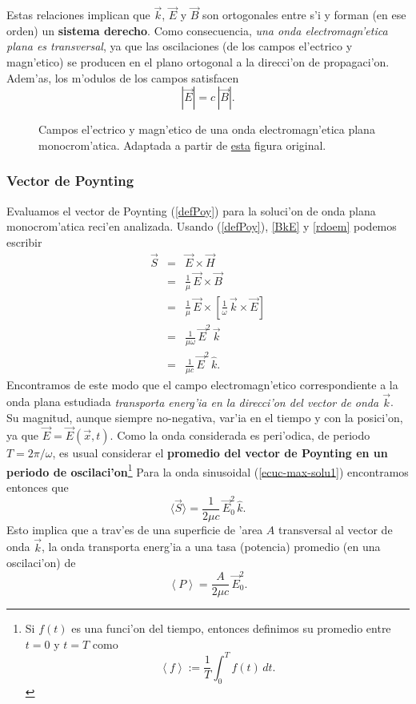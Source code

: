 Estas relaciones implican que $\vec{k}$, $\vec{E}$ y $\vec{B}$ son ortogonales
entre s'i y forman (en ese orden) un \textbf{sistema derecho}. Como consecuencia, \textit{una onda electromagn'etica plana es transversal}, ya que las oscilaciones (de los campos el'ectrico y magn'etico) se producen en el plano ortogonal a la direcci'on de propagaci'on. Adem'as, los m'odulos de los campos satisfacen
\begin{equation}
 | \vec{E}|=c\,| \vec{B}| .
\end{equation}
\begin{figure}[!h]
\centerline{}
\caption{Campos el'ectrico y magn'etico de una onda electromagn'etica plana monocrom'atica. Adaptada a partir de \href{http://commons.wikimedia.org/wiki/File:Onde_electromagnetique.svg}{esta} figura original.}
\label{ondaem}
\end{figure}

\subsubsection{Vector de Poynting}
Evaluamos el vector de Poynting (\ref{defPoy}) para la soluci'on de onda plana monocrom'atica reci'en analizada. Usando (\ref{defPoy}), \eqref{BkE} y \eqref{rdoem} podemos escribir
\begin{eqnarray}
 \vec{S}&=&\vec{E}\times\vec{H} \\
&=&\frac{1}{\mu}\,\vec{E}\times\vec{B} \\
&=&\frac{1}{\mu}\,\vec{E}\times\left[\frac{1}{\omega}\,\vec{k}\times\vec{E}
\right] \\
&=&\frac{1}{\mu\omega}\,\vec{E}^2\,\vec{k}\\
&=&\frac{1}{\mu c}\,\vec{E}^2\,\hat{k}. \label{Sop}
\end{eqnarray}
Encontramos de este modo que el campo electromagn'etico correspondiente a la onda plana estudiada \textit{transporta energ'ia en la direcci'on del vector de onda $\vec{k}$}. Su magnitud, aunque siempre no-negativa, var'ia en el tiempo y con la posici'on, ya que $\vec{E}=\vec{E}(\vec{x},t)$. Como la onda considerada es peri'odica, de periodo $T=2\pi/\omega$, es usual considerar el \textbf{promedio del vector de Poynting en un periodo de oscilaci'on}\footnote{Si $f(t)$ es una funci'on del tiempo, entonces definimos su promedio entre $t=0$ y $t=T$ como 
\begin{equation}
\left<f\right>:=\frac{1}{T}\int_0^Tf(t)\,dt.
\end{equation}}
Para la onda sinusoidal (\ref{ecuc-max-solu1}) encontramos entonces que
\begin{equation}\label{Sprom}
\langle\vec{S}\rangle=\frac{1}{2\mu c}\,\vec{E}_0^2\,\hat{k}.
\end{equation}
Esto implica que a trav'es de una superficie de 'area $A$ transversal al vector de onda $\vec{k}$, la onda transporta energ'ia a una tasa (potencia) promedio (en una oscilaci'on) de 
\begin{equation}
 \left<P\right>=\frac{A}{2\mu c}\,\vec{E}_0^2.
\end{equation}

